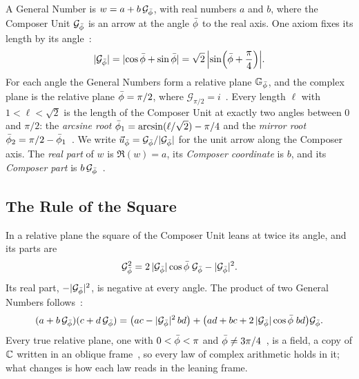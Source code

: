 A General Number is $w = a + b\,\mathcal{G}_{\bar{\phi}}$, with real numbers $a$ and $b$, where the Composer Unit $\mathcal{G}_{\bar{\phi}}$ is an arrow at the angle $\bar{\phi}$ to the real axis. One axiom fixes its length by its angle~\citep[Axiom~3.1]{DerrazGN2026}:
\begin{equation}\label{eq:axiom}
\lvert\mathcal{G}_{\bar{\phi}}\rvert = \lvert\cos\bar{\phi} + \sin\bar{\phi}\rvert = \sqrt{2}\,\Bigl\lvert\sin\Bigl(\bar{\phi} + \frac{\pi}{4}\Bigr)\Bigr\rvert .
\end{equation}
For each angle the General Numbers form a relative plane $\mathbb{G}_{\bar{\phi}}$, and the complex plane is the relative plane $\bar{\phi} = \pi/2$, where $\mathcal{G}_{\pi/2} = i$~\citep[Definition~3.2 and Proposition~3.4]{DerrazGN2026}. Every length $\ell$ with $1 < \ell < \sqrt{2}$ is the length of the Composer Unit at exactly two angles between $0$ and $\pi/2$: the \emph{arcsine root} $\bar{\phi}_1 = \arcsin(\ell/\sqrt{2}) - \pi/4$ and the \emph{mirror root} $\bar{\phi}_2 = \pi/2 - \bar{\phi}_1$~\citep[Theorem~3.6]{DerrazGN2026}. We write $\vec{u}_{\bar{\phi}} = \mathcal{G}_{\bar{\phi}}/\lvert\mathcal{G}_{\bar{\phi}}\rvert$ for the unit arrow along the Composer axis. The \emph{real part} of $w$ is $\Re(w) = a$, its \emph{Composer coordinate} is $b$, and its \emph{Composer part} is $b\,\mathcal{G}_{\bar{\phi}}$~\citep[Definition~3.9]{DerrazGN2026}.

\subsection{The Rule of the Square}\label{subsec:square}

In a relative plane the square of the Composer Unit leans at twice its angle, and its parts are~\citep[Proposition~4.1]{DerrazGN2026}
\begin{equation}\label{eq:square}
\mathcal{G}_{\bar{\phi}}^2 = 2\,\lvert\mathcal{G}_{\bar{\phi}}\rvert\cos\bar{\phi}\;\mathcal{G}_{\bar{\phi}} - \lvert\mathcal{G}_{\bar{\phi}}\rvert^2 .
\end{equation}
Its real part, $-\lvert\mathcal{G}_{\bar{\phi}}\rvert^2$, is negative at every angle. The product of two General Numbers follows~\citep[Proposition~4.2]{DerrazGN2026}:
\begin{equation}\label{eq:product}
(a + b\,\mathcal{G}_{\bar{\phi}})(c + d\,\mathcal{G}_{\bar{\phi}}) = \bigl(ac - \lvert\mathcal{G}_{\bar{\phi}}\rvert^2\,bd\bigr) + \bigl(ad + bc + 2\,\lvert\mathcal{G}_{\bar{\phi}}\rvert\cos\bar{\phi}\;bd\bigr)\mathcal{G}_{\bar{\phi}} .
\end{equation}
Every true relative plane, one with $0 < \bar{\phi} < \pi$ and $\bar{\phi} \neq 3\pi/4$~\citep[Definition~3.2]{DerrazGN2026}, is a field, a copy of $\mathbb{C}$ written in an oblique frame~\citep[Proposition~4.3 and Corollary~4.11]{DerrazGN2026}, so every law of complex arithmetic holds in it; what changes is how each law reads in the leaning frame.

